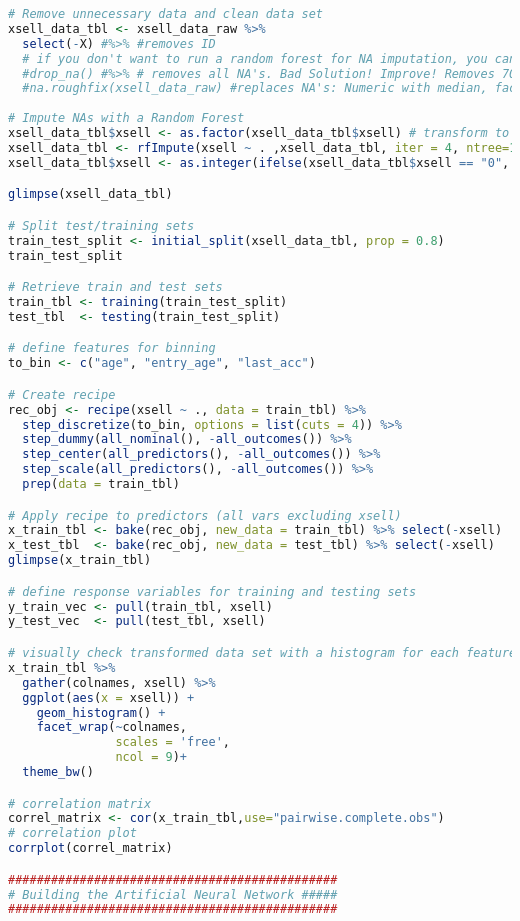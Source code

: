 \begin{lstlisting}[language=R,caption={Main analysis}, label=lst_main]
# Remove unnecessary data and clean data set
xsell_data_tbl <- xsell_data_raw %>%
  select(-X) #%>% #removes ID
  # if you don't want to run a random forest for NA imputation, you can do apply of the two easier fixes to NA's:
  #drop_na() #%>% # removes all NA's. Bad Solution! Improve! Removes 70% of observations
  #na.roughfix(xsell_data_raw) #replaces NA's: Numeric with median, factor with mode
  
# Impute NAs with a Random Forest
xsell_data_tbl$xsell <- as.factor(xsell_data_tbl$xsell) # transform to factor for random forest imputation
xsell_data_tbl <- rfImpute(xsell ~ . ,xsell_data_tbl, iter = 4, ntree=100) 
xsell_data_tbl$xsell <- as.integer(ifelse(xsell_data_tbl$xsell == "0", 0, 1)) # transform back to numeric

glimpse(xsell_data_tbl)

# Split test/training sets
train_test_split <- initial_split(xsell_data_tbl, prop = 0.8)
train_test_split

# Retrieve train and test sets
train_tbl <- training(train_test_split)
test_tbl  <- testing(train_test_split)

# define features for binning
to_bin <- c("age", "entry_age", "last_acc")

# Create recipe
rec_obj <- recipe(xsell ~ ., data = train_tbl) %>%
  step_discretize(to_bin, options = list(cuts = 4)) %>%
  step_dummy(all_nominal(), -all_outcomes()) %>%
  step_center(all_predictors(), -all_outcomes()) %>%
  step_scale(all_predictors(), -all_outcomes()) %>%
  prep(data = train_tbl)

# Apply recipe to predictors (all vars excluding xsell)
x_train_tbl <- bake(rec_obj, new_data = train_tbl) %>% select(-xsell)
x_test_tbl  <- bake(rec_obj, new_data = test_tbl) %>% select(-xsell)
glimpse(x_train_tbl)

# define response variables for training and testing sets
y_train_vec <- pull(train_tbl, xsell)
y_test_vec  <- pull(test_tbl, xsell)

# visually check transformed data set with a histogram for each feature
x_train_tbl %>% 
  gather(colnames, xsell) %>% 
  ggplot(aes(x = xsell)) + 
    geom_histogram() +
    facet_wrap(~colnames,
               scales = 'free', 
               ncol = 9)+
  theme_bw()

# correlation matrix
correl_matrix <- cor(x_train_tbl,use="pairwise.complete.obs")
# correlation plot
corrplot(correl_matrix) 

##############################################
# Building the Artificial Neural Network #####
##############################################


\end{lstlisting}
